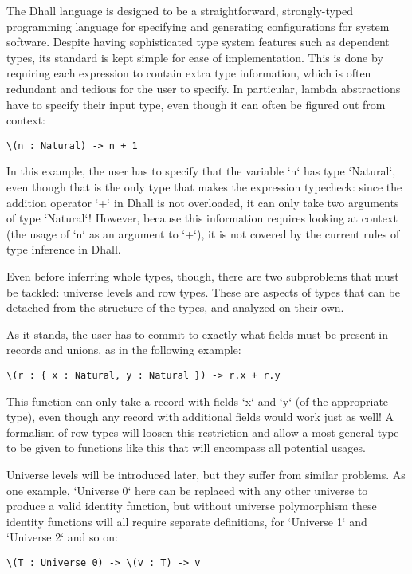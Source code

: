 \documentclass[11pt, twoside, reqno]{book}
\begin{document}
The Dhall language is designed to be a straightforward, strongly-typed programming language for specifying and generating configurations for system software.
Despite having sophisticated type system features such as dependent types, its standard is kept simple for ease of implementation.
This is done by requiring each expression to contain extra type information, which is often redundant and tedious for the user to specify.
In particular, lambda abstractions have to specify their input type, even though it can often be figured out from context:
\begin{verbatim}
\(n : Natural) -> n + 1
\end{verbatim}
In this example, the user has to specify that the variable \inHS`n` has type \inHS`Natural`, even though that is the only type that makes the expression typecheck: since the addition operator \inHS`+` in Dhall is not overloaded, it can only take two arguments of type \inHS`Natural`!
However, because this information requires looking at context (the usage of \inHS`n` as an argument to \inHS`+`), it is not covered by the current rules of type inference in Dhall.

Even before inferring whole types, though, there are two subproblems that must be tackled: universe levels and row types.
These are aspects of types that can be detached from the structure of the types, and analyzed on their own.

As it stands, the user has to commit to exactly what fields must be present in records and unions, as in the following example:
\begin{verbatim}
\(r : { x : Natural, y : Natural }) -> r.x + r.y
\end{verbatim}
This function can only take a record with fields \inHS`x` and \inHS`y` (of the appropriate type), even though any record with additional fields would work just as well!
A formalism of row types will loosen this restriction and allow a most general type to be given to functions like this that will encompass all potential usages.

Universe levels will be introduced later, but they suffer from similar problems.
As one example, \inHS`Universe 0` here can be replaced with any other universe to produce a valid identity function, but without universe polymorphism these identity functions will all require separate definitions, for \inHS`Universe 1` and \inHS`Universe 2` and so on:
\begin{verbatim}
\(T : Universe 0) -> \(v : T) -> v
\end{verbatim}
\end{document}
